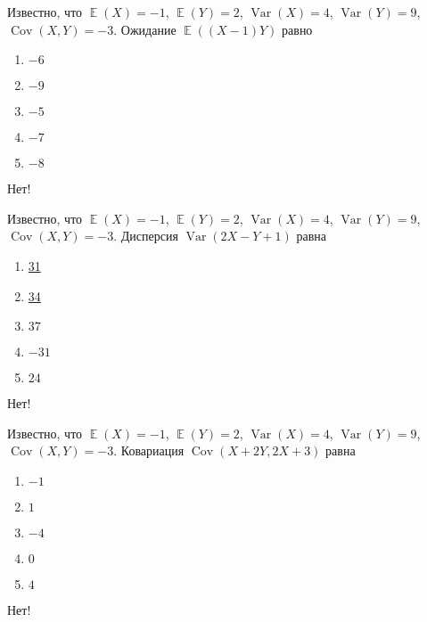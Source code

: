 \documentclass[t]{beamer}
\DeclareMathOperator{\Var}{Var}
\DeclareMathOperator{\Cov}{Cov}
\DeclareMathOperator{\E}{\mathbb{E}}
\begin{document}
 \begin{frame} \label{18-No} 
\begin{block}{18} 

Известно, что $\E(X)=-1$, $\E(Y)=2$, $\Var(X)=4$, $\Var(Y)=9$, $\Cov(X,Y)=-3$. Ожидание $\E((X-1)Y)$ равно

  


 \end{block} 
\begin{enumerate} 
\item[] \hyperlink{18-No}{\beamergotobutton{} $-6$}
\item[] \hyperlink{18-No}{\beamergotobutton{} $-9$}
\item[] \hyperlink{18-No}{\beamergotobutton{} $-5$}
\item[] \hyperlink{18-Yes}{\beamergotobutton{} $-7$}
\item[] \hyperlink{18-No}{\beamergotobutton{} $-8$}
\end{enumerate} 

 \alert{Нет!} 
\end{frame} 


 \begin{frame} \label{19-No} 
\begin{block}{19} 

Известно, что $\E(X)=-1$, $\E(Y)=2$, $\Var(X)=4$, $\Var(Y)=9$, $\Cov(X,Y)=-3$. Дисперсия $\Var(2X-Y+1)$ равна


 \end{block} 
\begin{enumerate} 
\item[] \hyperlink{19-No}{\beamergotobutton{} 31}
\item[] \hyperlink{19-No}{\beamergotobutton{} 34}
\item[] \hyperlink{19-Yes}{\beamergotobutton{} $37$}
\item[] \hyperlink{19-No}{\beamergotobutton{} $-31$}
\item[] \hyperlink{19-No}{\beamergotobutton{} $24$}
\end{enumerate} 

 \alert{Нет!} 
\end{frame} 


 \begin{frame} \label{20-No} 
\begin{block}{20} 

Известно, что $\E(X)=-1$, $\E(Y)=2$, $\Var(X)=4$, $\Var(Y)=9$, $\Cov(X,Y)=-3$. Ковариация $\Cov(X+2Y, 2X+3)$ равна


 \end{block} 
\begin{enumerate} 
\item[] \hyperlink{20-No}{\beamergotobutton{}  $-1$ }
\item[] \hyperlink{20-No}{\beamergotobutton{}  $1$ }
\item[] \hyperlink{20-Yes}{\beamergotobutton{}  $-4$ }
\item[] \hyperlink{20-No}{\beamergotobutton{}  $0$ }
\item[] \hyperlink{20-No}{\beamergotobutton{}  $4$ }
\end{enumerate} 

 \alert{Нет!} 
\end{frame} 
\end{document}
